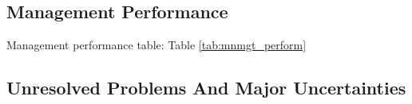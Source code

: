 \documentclass[12pt,]{article}
\begin{document}
\FloatBarrier

\subsection*{Management Performance}\label{management-performance}

Management performance table: Table \ref{tab:mnmgt_perform}

\begin{table}[ht]
\centering
\caption{Recent trend in total catch and commercial 
                              landings (mt) relative to the management guidelines. 
                              Estimated total catch reflect the commercial landings 
                              plus the model estimated discarded biomass.} 
\label{tab:mnmgt_perform}
\end{table}

\subsection*{Unresolved Problems And Major
Uncertainties}\label{unresolved-problems-and-major-uncertainties}
\end{document}
